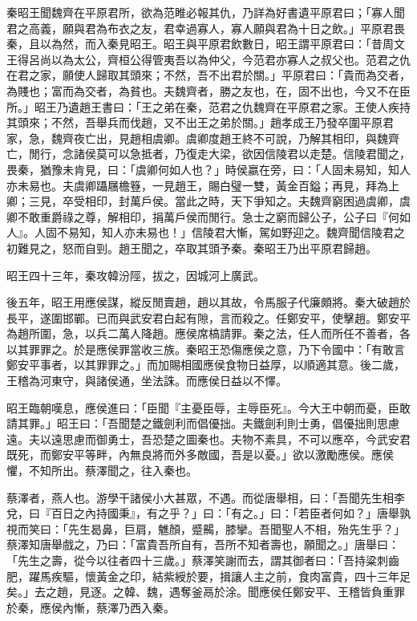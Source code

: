 \begin{pinyinscope}
秦昭王聞魏齊在平原君所，欲為范睢必報其仇，乃詳為好書遺平原君曰；「寡人聞君之高義，願與君為布衣之友，君幸過寡人，寡人願與君為十日之飲。」平原君畏秦，且以為然，而入秦見昭王。昭王與平原君飲數日，昭王謂平原君曰：「昔周文王得呂尚以為太公，齊桓公得管夷吾以為仲父，今范君亦寡人之叔父也。范君之仇在君之家，願使人歸取其頭來；不然，吾不出君於關。」平原君曰：「貴而為交者，為賤也；富而為交者，為貧也。夫魏齊者，勝之友也，在，固不出也，今又不在臣所。」昭王乃遺趙王書曰：「王之弟在秦，范君之仇魏齊在平原君之家。王使人疾持其頭來；不然，吾舉兵而伐趙，又不出王之弟於關。」趙孝成王乃發卒圍平原君家，急，魏齊夜亡出，見趙相虞卿。虞卿度趙王終不可說，乃解其相印，與魏齊亡，閒行，念諸侯莫可以急抵者，乃復走大梁，欲因信陵君以走楚。信陵君聞之，畏秦，猶豫未肯見，曰：「虞卿何如人也？」時侯嬴在旁，曰：「人固未易知，知人亦未易也。夫虞卿躡屩檐簦，一見趙王，賜白璧一雙，黃金百鎰；再見，拜為上卿；三見，卒受相印，封萬戶侯。當此之時，天下爭知之。夫魏齊窮困過虞卿，虞卿不敢重爵祿之尊，解相印，捐萬戶侯而閒行。急士之窮而歸公子，公子曰『何如人』。人固不易知，知人亦未易也！」信陵君大慚，駕如野迎之。魏齊聞信陵君之初難見之，怒而自剄。趙王聞之，卒取其頭予秦。秦昭王乃出平原君歸趙。

昭王四十三年，秦攻韓汾陘，拔之，因城河上廣武。

後五年，昭王用應侯謀，縱反閒賣趙，趙以其故，令馬服子代廉頗將。秦大破趙於長平，遂圍邯鄲。已而與武安君白起有隙，言而殺之。任鄭安平，使擊趙。鄭安平為趙所圍，急，以兵二萬人降趙。應侯席槁請罪。秦之法，任人而所任不善者，各以其罪罪之。於是應侯罪當收三族。秦昭王恐傷應侯之意，乃下令國中：「有敢言鄭安平事者，以其罪罪之。」而加賜相國應侯食物日益厚，以順適其意。後二歲，王稽為河東守，與諸侯通，坐法誅。而應侯日益以不懌。

昭王臨朝嘆息，應侯進曰：「臣聞『主憂臣辱，主辱臣死』。今大王中朝而憂，臣敢請其罪。」昭王曰：「吾聞楚之鐵劍利而倡優拙。夫鐵劍利則士勇，倡優拙則思慮遠。夫以遠思慮而御勇士，吾恐楚之圖秦也。夫物不素具，不可以應卒，今武安君既死，而鄭安平等畔，內無良將而外多敵國，吾是以憂。」欲以激勵應侯。應侯懼，不知所出。蔡澤聞之，往入秦也。

蔡澤者，燕人也。游學干諸侯小大甚眾，不遇。而從唐舉相，曰：「吾聞先生相李兌，曰『百日之內持國秉』，有之乎？」曰：「有之。」曰：「若臣者何如？」唐舉孰視而笑曰：「先生曷鼻，巨肩，魋顏，蹙齃，膝攣。吾聞聖人不相，殆先生乎？」蔡澤知唐舉戲之，乃曰：「富貴吾所自有，吾所不知者壽也，願聞之。」唐舉曰：「先生之壽，從今以往者四十三歲。」蔡澤笑謝而去，謂其御者曰：「吾持粱刺齒肥，躍馬疾驅，懷黃金之印，結紫綬於要，揖讓人主之前，食肉富貴，四十三年足矣。」去之趙，見逐。之韓、魏，遇奪釜鬲於涂。聞應侯任鄭安平、王稽皆負重罪於秦，應侯內慚，蔡澤乃西入秦。


\end{pinyinscope}
